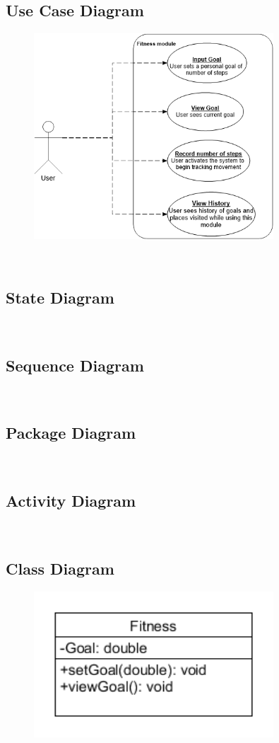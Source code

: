 \subsection{Use Case Diagram}
\begin{figure} 
  \includegraphics[width=0.8\textwidth]{Fitness/FitnessUseCase.png}
\end{figure}

\\

\subsection{State Diagram}

\\

\subsection{Sequence Diagram}

\\

\subsection{Package Diagram}

\\

\subsection{Activity Diagram}

\\

\subsection{Class Diagram}
\begin{figure} 
  \includegraphics[width=0.8\textwidth]{Fitness/FitnessClassDgm.png}
\end{figure}

\\
